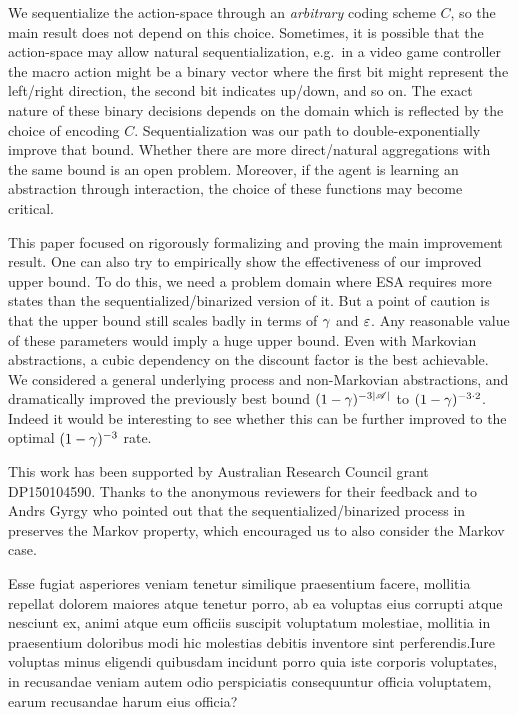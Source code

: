 \documentclass{article} %
\renewcommand{\bibstylename}{aaai21} %
\renewcommand{\bibstylename}{apalike}
\renewcommand{\bibstylename}{unsrtnat}
\begin{document}
We sequentialize the action-space through an \emph{arbitrary} coding scheme $C$, so the main result does not depend on this choice. Sometimes, it is possible that the action-space may allow natural sequentialization, e.g.\ in a video game controller the macro action might be a binary vector where the first bit might represent the left/right direction, the second bit indicates up/down, and so on. The exact nature of these binary decisions depends on the domain which is reflected by the choice of encoding $C$. Sequentialization was our path to double-exponentially improve that bound. Whether there are more direct/natural aggregations with the same bound is an open problem. Moreover, if the agent is learning an abstraction through interaction, the choice of these functions may become critical.

This paper focused on rigorously formalizing and proving the main improvement result. One can also try to empirically show the effectiveness of our improved upper bound. To do this, we need a problem domain where ESA requires more states than the sequentialized/binarized version of it. But a point of caution is that the upper bound still scales badly in terms of $\gamma$ and $\varepsilon$. Any reasonable value of these parameters would imply a huge upper bound.
Even with Markovian abstractions, a cubic dependency on the discount factor is the best achievable.
We considered a general underlying process and non-Markovian abstractions,
and dramatically improved the previously best bound $(1-\gamma)^{-3|\mathscr{A}|}$ to $(1-\gamma)^{-3\cdot 2}$.
Indeed it would be interesting to see whether this can be further improved to the optimal $(1-\gamma)^{-3}$ rate.

This work has been supported by Australian Research Council grant  DP150104590. Thanks to the anonymous reviewers for their feedback and to Andrs Gyrgy who pointed out that the sequentialized/binarized process in  preserves the Markov property, which encouraged us to also consider the Markov case.

\begin{small}

Esse fugiat asperiores veniam tenetur similique praesentium facere, mollitia repellat dolorem maiores atque tenetur porro, ab ea voluptas eius corrupti atque nesciunt ex, animi atque eum officiis suscipit voluptatum molestiae, mollitia in praesentium doloribus modi hic molestias debitis inventore sint perferendis.Iure voluptas minus eligendi quibusdam incidunt porro quia iste corporis voluptates, in recusandae veniam autem odio perspiciatis consequuntur officia voluptatem, earum recusandae harum eius officia?\clearpage

\end{small}
\end{document}

